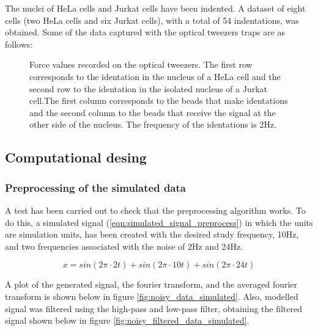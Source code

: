 \documentclass[12pt, a4paper]{article} %
\begin{document}
The nuclei of HeLa cells and Jurkat cells have been indented. A dataset of eight cells (two HeLa cells and six Jurkat cells), with a total of 54 indentations, was obtained. Some of the data captured with the optical tweezers traps are as follows:

\setlength{\parskip}{4mm}

\begin{figure}[htbp]
	\centering
	
	\caption{Force values recorded on the optical tweezers. The first row corresponds to the identation in the nucleus of a HeLa cell and the second row to the identation in the isolated nucleus of a Jurkat cell.The first column corresponds to the beads that make identations and the second column to the beads that receive the signal at the other side of the nucleus. The frequency of the identations is 2Hz.}
	\label{fig:raw_data_cells}
\end{figure}

\setlength{\parskip}{0mm}

\subsection{Computational desing}

\subsubsection{Preprocessing of the simulated data}

A test has been carried out to check that the preprocessing algorithm works. To do this, a simulated signal (\ref{eqn:simulated_signal_preprocess}) in which the units are simulation units, has been created with the desired study frequency, 10Hz, and two frequencies associated with the noise of 2Hz and 24Hz. 

\setlength{\parskip}{4mm}

\begin{equation} \label{eqn:simulated_signal_preprocess}
	x = sin(2\pi\cdot 2t) + sin(2\pi\cdot 10t) + sin(2\pi\cdot 24t)
\end{equation}

A plot of the generated signal, the fourier transform, and the averaged fourier transform is shown below in figure \ref{fig:noisy_data_simulated}. Also, modelled signal was filtered using the high-pass and low-pass filter, obtaining the filtered signal shown below in figure \ref{fig:noisy_filtered_data_simulated}.
\end{document}
